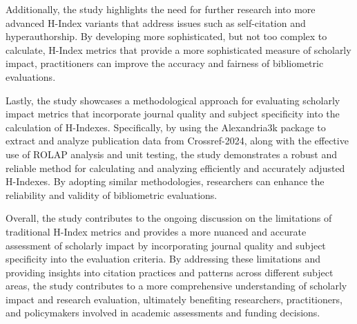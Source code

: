 Additionally, the study highlights the need for further research into more
advanced H-Index variants that address issues such as self-citation and
hyperauthorship. By developing more sophisticated, but not too complex to
calculate, H-Index metrics that provide a more sophisticated measure of
scholarly impact, practitioners can improve the accuracy and fairness of
bibliometric evaluations.

Lastly, the study showcases a methodological approach for evaluating scholarly
impact metrics that incorporate journal quality and subject specificity into
the calculation of H-Indexes. Specifically, by using the Alexandria3k package to
extract and analyze publication data from Crossref-2024, along with the
effective use of ROLAP analysis and unit testing, the study demonstrates a
robust and reliable method for calculating and analyzing efficiently and
accurately adjusted H-Indexes. By adopting similar methodologies, researchers
can enhance the reliability and validity of bibliometric evaluations.

Overall, the study contributes to the ongoing discussion on the limitations of
traditional H-Index metrics and provides a more nuanced and accurate assessment
of scholarly impact by incorporating journal quality and subject specificity
into the evaluation criteria. By addressing these limitations and providing
insights into citation practices and patterns across different subject areas,
the study contributes to a more comprehensive understanding of scholarly impact
and research evaluation, ultimately benefiting researchers, practitioners, and
policymakers involved in academic assessments and funding decisions. %
